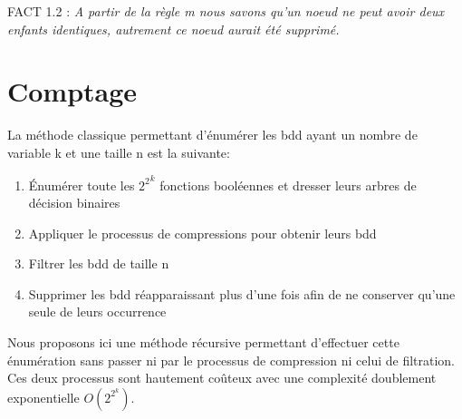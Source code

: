 \documentclass[french]{article}
\begin{document}
FACT 1.2 : \emph{A partir de la règle m nous savons qu'un noeud ne peut avoir deux enfants identiques, autrement ce noeud aurait été supprimé.}

\newpage
\section{Comptage}
La méthode classique permettant d'énumérer les bdd ayant un nombre de variable k et une taille n est la suivante:
\begin{enumerate}
    \item 
	Énumérer toute les \({2^2}^k\) fonctions booléennes et dresser leurs arbres de décision binaires
	\item
	Appliquer le processus de compressions pour obtenir leurs bdd
	\item
    Filtrer les bdd de taille n
	\item
	Supprimer les bdd réapparaissant plus d'une fois afin de ne conserver qu'une seule de leurs occurrence
\end{enumerate}
Nous proposons ici une méthode récursive permettant d'effectuer cette énumération sans passer ni par le processus de compression ni celui de filtration. Ces deux processus sont hautement coûteux avec une complexité doublement exponentielle \(O(2^{2^{k}})\).
\vspace{5mm} %
\end{document}
